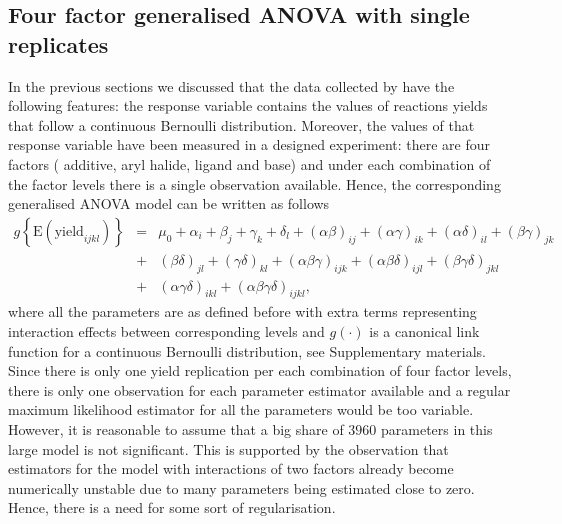 \documentclass[12pt]{article}
\def\beq{\begin{eqnarray}}
\def\eeq{\end{eqnarray}}
\begin{document}
\subsection{Four factor generalised ANOVA with single replicates}
In the previous sections we discussed that the data collected by \citet{Ahneman2018} have the following features: the response variable contains the values of reactions yields that follow a continuous Bernoulli distribution. Moreover, the values of that response variable have been measured in a designed experiment: there are four factors ({\color{blue} additive, aryl halide, ligand and base}) and under each combination of the factor levels there is a single observation available. Hence, the corresponding generalised ANOVA model can be written as follows
\beq
\label{eq:anovamodel}
g\left\{\mbox{E}(\mbox{yield}_{ijkl})\right\}&=&\mu_0+\alpha_i+\beta_j+\gamma_k+\delta_l+(\alpha\beta)_{ij}+(\alpha\gamma)_{ik}+(\alpha\delta)_{il}+(\beta\gamma)_{jk}\nonumber \\
&+&(\beta\delta)_{jl}+(\gamma\delta)_{kl}+(\alpha\beta\gamma)_{ijk}+(\alpha\beta\delta)_{ijl}+(\beta\gamma\delta)_{jkl}\\
&+&(\alpha\gamma\delta)_{ikl}+(\alpha\beta\gamma\delta)_{ijkl},\nonumber
\eeq
where all the parameters are as defined before with extra terms representing interaction effects between corresponding levels and $g(\cdot)$ is a canonical link function for a continuous Bernoulli distribution, see Supplementary materials. Since there is only one yield replication per each combination of four factor levels, there is only one observation for each parameter estimator available and a regular maximum likelihood estimator for all the parameters would be too variable. However, it is reasonable to assume that a big share of $3960$ parameters in this large model is not significant. This is supported by the observation that estimators for the model with interactions of two factors already become numerically unstable due to many parameters being estimated close to zero. Hence, there is a need for some sort of regularisation.\\
\end{document}
